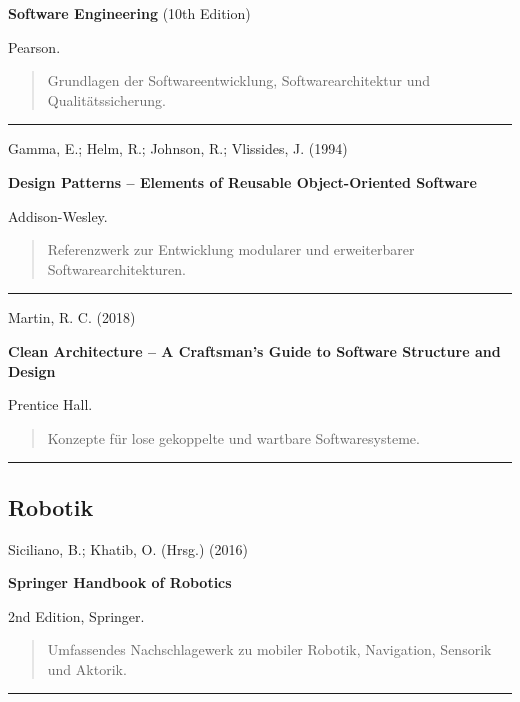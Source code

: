 \textbf{Software Engineering} (10th Edition)

Pearson.

\begin{quote}
Grundlagen der Softwareentwicklung, Softwarearchitektur und
Qualitätssicherung.
\end{quote}

\begin{center}\rule{0.5\linewidth}{0.5pt}\end{center}

Gamma, E.; Helm, R.; Johnson, R.; Vlissides, J. (1994)

\textbf{Design Patterns -- Elements of Reusable Object-Oriented
Software}

Addison-Wesley.

\begin{quote}
Referenzwerk zur Entwicklung modularer und erweiterbarer
Softwarearchitekturen.
\end{quote}

\begin{center}\rule{0.5\linewidth}{0.5pt}\end{center}

Martin, R. C. (2018)

\textbf{Clean Architecture -- A Craftsman's Guide to Software Structure
and Design}

Prentice Hall.

\begin{quote}
Konzepte für lose gekoppelte und wartbare Softwaresysteme.
\end{quote}

\begin{center}\rule{0.5\linewidth}{0.5pt}\end{center}

\subsection{Robotik}\label{robotik}

Siciliano, B.; Khatib, O. (Hrsg.) (2016)

\textbf{Springer Handbook of Robotics}

2nd Edition, Springer.

\begin{quote}
Umfassendes Nachschlagewerk zu mobiler Robotik, Navigation, Sensorik und
Aktorik.
\end{quote}

\begin{center}\rule{0.5\linewidth}{0.5pt}\end{center}

